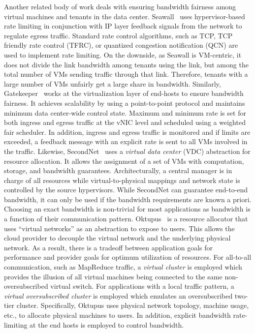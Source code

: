 \documentclass[a4paper,12pt,twoside,openright]{report}
\begin{document}
Another related body of work deals with ensuring bandwidth fairness among
virtual machines and tenants in the data center. Seawall~\cite{Shieh:2010:SPI}
uses hypervisor-based rate limiting in conjunction with IP layer feedback
signals from the network to regulate egress traffic. Standard rate control
algorithms, such as TCP, TCP friendly rate control (TFRC), or quantized
congestion notification (QCN) are used to implement rate limiting. On the
downside, as Seawall is VM-centric, it does not divide the link bandwidth among
tenants using the link, but among the total number of VMs sending traffic
through that link. Therefore, tenants with a large number of VMs unfairly get a
large share in bandwidth. Similarly, Gatekeeper~\cite{Rodrigues:2011:GSB} works
at the virtualization layer of end-hosts to ensure bandwidth fairness. It
achieves scalability by using a point-to-point protocol and maintains minimum
data center-wide control state. Maximum and minimum rate is set for both ingress
and egress traffic at the vNIC level and scheduled using a weighted fair
scheduler. In addition, ingress and egress traffic is monitored and if limits
are exceeded, a feedback message with an explicit rate is sent to all VMs
involved in the traffic. Likewise, SecondNet~\cite{Guo:2010:SDC} uses a
\emph{virtual data center} (VDC) abstraction for resource allocation. It allows
the assignment of a set of VMs with computation, storage, and bandwidth
guarantees. Architecturally, a central manager is in charge of all resources
while virtual-to-physical mappings and network state is controlled by the source
hypervisors. While SecondNet can guarantee end-to-end bandwidth, it can only be
used if the bandwidth requirements are known a priori. Choosing an exact
bandwidth is non-trivial for most applications as bandwidth is a function of
their communication pattern. Oktupus~\cite{Ballani:2011:TPD} is a resource
allocator that uses ``virtual networks'' as an abstraction to expose to users.
This allows the cloud provider to decouple the virtual network and the
underlying physical network. As a result, there is a tradeoff between
application goals for performance and provider goals for optimum utilization of
resources. For all-to-all communication, such as MapReduce traffic, a
\emph{virtual cluster} is employed which provides the illusion of all virtual
machines being connected to the same non-oversubscribed virtual switch.  For
applications with a local traffic pattern, a \emph{virtual oversubscribed
cluster} is employed which emulates an oversubscribed two-tier cluster.
Specifically, Oktupus uses physical network topology, machine usage, etc., to
allocate physical machines to users. In addition, explicit bandwidth
rate-limiting at the end hosts is employed to control bandwidth.
\end{document}
